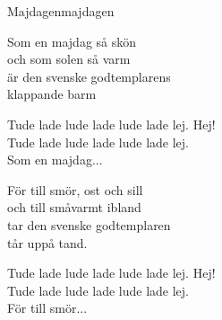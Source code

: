 \begin{song}{Majdagen}{majdagen}
\begin{vers}
Som en majdag så skön\\
och som solen så varm\\
är den svenske godtemplarens\\
klappande barm\\
\end{vers}
\begin{vers}
Tude lade lude lade lude lade lej. Hej!\\
Tude lade lude lade lude lade lej.\\
Som en majdag...
\end{vers}
\begin{vers}
För till smör, ost och sill\\
och till småvarmt ibland\\
tar den svenske godtemplaren\\
tår uppå tand.\\
\end{vers}
\begin{vers}
Tude lade lude lade lude lade lej. Hej!\\
Tude lade lude lade lude lade lej.\\
För till smör...
\end{vers}
\end{song}
